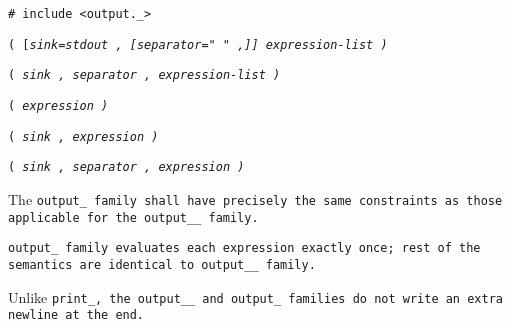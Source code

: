 
\tt{# include <output._>}

\s\s\s\tt{(} [\it{sink}\tt{=stdout} \tt{,}
[\it{separator}\tt{=" "} \tt{,}]] \it{expression-list} \tt{)}

\s\tt{(} \it{sink} \tt{,}
 \it{separator} \tt{,} \it{expression-list} \tt{)}

\s\tt{(} \it{expression} \tt{)}

\s\tt{(} \it{sink} \tt{,} \it{expression} \tt{)}

\s\tt{(} \it{sink} \tt{,} \it{separator} \tt{,} \it{expression} \tt{)}


The \tt{output_} family shall have precisely the same
constraints as those applicable for the \tt{output__} family.


\tt{output_} family evaluates each expression exactly once;
rest of the semantics are identical to  \tt{output__} family.

\note Unlike \tt{print_}, the \tt{output__} and \tt{output_}
families do not write an extra newline at the end.
